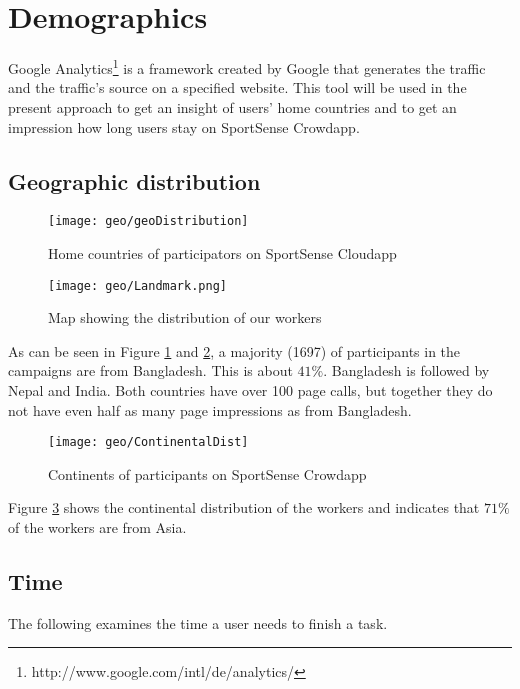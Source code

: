 \newpage
\section{Demographics}\label{sec:analytics}

Google Analytics\footnote{http://www.google.com/intl/de/analytics/} is a framework created by Google that generates the traffic and the traffic's source on a specified website. This tool will be used in the present approach to get an insight of users' home countries and to get an impression how long users stay on SportSense Crowdapp.

\subsection{Geographic distribution}

\begin{figure}[H]
    \centering
    \texttt{[image: geo/geoDistribution]}
    \caption{Home countries of participators on SportSense Cloudapp}
    \label{fig:geoDist}
\end{figure}

\begin{figure}[H]
    \centering
    \texttt{[image: geo/Landmark.png]}
    \caption{Map showing the distribution of our workers}
    \label{fig:map}
\end{figure}

As can be seen in Figure \ref{fig:geoDist} and \ref{fig:map}, a majority (1697) of participants in the campaigns are from Bangladesh. This is about $41\%$.
Bangladesh is followed by Nepal and India. Both countries have over 100 page calls, but together they do not have even half as many page impressions as from Bangladesh.


\begin{figure}[H]
    \centering
    \texttt{[image: geo/ContinentalDist]}
    \caption{Continents of participants on SportSense Crowdapp}
    \label{img:contDist}
\end{figure}

Figure \ref{img:contDist} shows the continental distribution of the workers and indicates that $71\%$ of the workers are from Asia.

\subsection{Time}

The following examines the time a user needs to finish a task.

